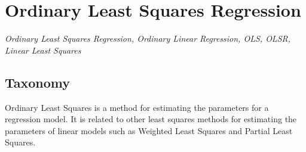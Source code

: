 

\section{Ordinary Least Squares Regression} 
\label{sec:ordinary}

\emph{Ordinary Least Squares Regression, Ordinary Linear Regression, OLS, OLSR, Linear Least Squares}

\subsection{Taxonomy}
Ordinary Least Squares is a method for estimating the parameters for a regression model.
It is related to other least squares methods for estimating the parameters of linear models such as Weighted Least Squares and Partial Least Squares.


